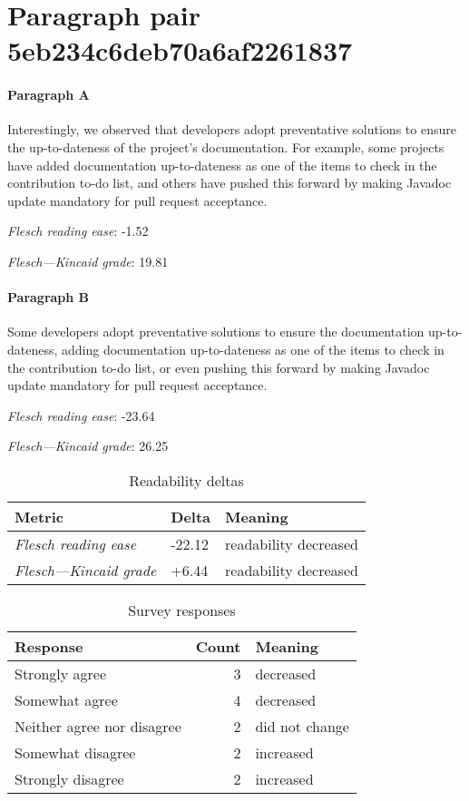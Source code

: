 \newpage
\section{Paragraph pair 5eb234c6deb70a6af2261837}
\paragraph{Paragraph A}
Interestingly, we observed that developers adopt preventative solutions to ensure the up-to-dateness of the project's documentation. For example, some projects have added documentation up-to-dateness as one of the items to check in the contribution to-do list, and others have pushed this forward by making Javadoc update mandatory for pull request acceptance.\par\medskip
\emph{Flesch reading ease}: -1.52\par
\emph{Flesch---Kincaid grade}: 19.81

\paragraph{Paragraph B}
Some developers adopt preventative solutions to ensure the documentation up-to-dateness, adding documentation up-to-dateness as one of the items to check in the contribution to-do list, or even pushing this forward by making Javadoc update mandatory for pull request acceptance.\par\medskip
\emph{Flesch reading ease}: -23.64\par
\emph{Flesch---Kincaid grade}: 26.25

\bigskip\begin{table}[!h]
\centering
\begin{tabular}{lll}
\toprule
               \textbf{Metric} & \textbf{Delta} &       \textbf{Meaning} \\
\midrule
    \emph{Flesch reading ease} &         -22.12 &  readability decreased \\
 \emph{Flesch---Kincaid grade} &          +6.44 &  readability decreased \\
\bottomrule
\end{tabular}
\caption*{Readability deltas}\end{table}

\begin{table}[!h]
\centering
\begin{tabular}{lrl}
\toprule
          \textbf{Response} &  \textbf{Count} & \textbf{Meaning} \\
\midrule
             Strongly agree &               3 &        decreased \\
             Somewhat agree &               4 &        decreased \\
 Neither agree nor disagree &               2 &   did not change \\
          Somewhat disagree &               2 &        increased \\
          Strongly disagree &               2 &        increased \\
\bottomrule
\end{tabular}
\caption*{Survey responses}\end{table}


